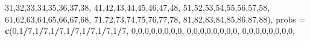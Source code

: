 \documentclass[,man,floatsintext]{apa6}
\newenvironment{Shaded}{\begin{snugshade}}{\end{snugshade}}
\newcommand{\DataTypeTok}[1]{\textcolor[rgb]{0.13,0.29,0.53}{#1}}
\newcommand{\DecValTok}[1]{\textcolor[rgb]{0.00,0.00,0.81}{#1}}
\newcommand{\KeywordTok}[1]{\textcolor[rgb]{0.13,0.29,0.53}{\textbf{#1}}}
\newcommand{\NormalTok}[1]{#1}
\newcommand{\OperatorTok}[1]{\textcolor[rgb]{0.81,0.36,0.00}{\textbf{#1}}}
\begin{document}
\begin{Shaded}
\begin{Highlighting}[]
                         \DecValTok{31}\NormalTok{,}\DecValTok{32}\NormalTok{,}\DecValTok{33}\NormalTok{,}\DecValTok{34}\NormalTok{,}\DecValTok{35}\NormalTok{,}\DecValTok{36}\NormalTok{,}\DecValTok{37}\NormalTok{,}\DecValTok{38}\NormalTok{,}
                         \DecValTok{41}\NormalTok{,}\DecValTok{42}\NormalTok{,}\DecValTok{43}\NormalTok{,}\DecValTok{44}\NormalTok{,}\DecValTok{45}\NormalTok{,}\DecValTok{46}\NormalTok{,}\DecValTok{47}\NormalTok{,}\DecValTok{48}\NormalTok{,}
                         \DecValTok{51}\NormalTok{,}\DecValTok{52}\NormalTok{,}\DecValTok{53}\NormalTok{,}\DecValTok{54}\NormalTok{,}\DecValTok{55}\NormalTok{,}\DecValTok{56}\NormalTok{,}\DecValTok{57}\NormalTok{,}\DecValTok{58}\NormalTok{,}
                         \DecValTok{61}\NormalTok{,}\DecValTok{62}\NormalTok{,}\DecValTok{63}\NormalTok{,}\DecValTok{64}\NormalTok{,}\DecValTok{65}\NormalTok{,}\DecValTok{66}\NormalTok{,}\DecValTok{67}\NormalTok{,}\DecValTok{68}\NormalTok{,}
                         \DecValTok{71}\NormalTok{,}\DecValTok{72}\NormalTok{,}\DecValTok{73}\NormalTok{,}\DecValTok{74}\NormalTok{,}\DecValTok{75}\NormalTok{,}\DecValTok{76}\NormalTok{,}\DecValTok{77}\NormalTok{,}\DecValTok{78}\NormalTok{,}
                         \DecValTok{81}\NormalTok{,}\DecValTok{82}\NormalTok{,}\DecValTok{83}\NormalTok{,}\DecValTok{84}\NormalTok{,}\DecValTok{85}\NormalTok{,}\DecValTok{86}\NormalTok{,}\DecValTok{87}\NormalTok{,}\DecValTok{88}\NormalTok{),}
               \DataTypeTok{probs =} \KeywordTok{c}\NormalTok{(}\DecValTok{0}\NormalTok{,}\DecValTok{1}\OperatorTok{/}\DecValTok{7}\NormalTok{,}\DecValTok{1}\OperatorTok{/}\DecValTok{7}\NormalTok{,}\DecValTok{1}\OperatorTok{/}\DecValTok{7}\NormalTok{,}\DecValTok{1}\OperatorTok{/}\DecValTok{7}\NormalTok{,}\DecValTok{1}\OperatorTok{/}\DecValTok{7}\NormalTok{,}\DecValTok{1}\OperatorTok{/}\DecValTok{7}\NormalTok{,}\DecValTok{1}\OperatorTok{/}\DecValTok{7}\NormalTok{,}
                         \DecValTok{0}\NormalTok{,}\DecValTok{0}\NormalTok{,}\DecValTok{0}\NormalTok{,}\DecValTok{0}\NormalTok{,}\DecValTok{0}\NormalTok{,}\DecValTok{0}\NormalTok{,}\DecValTok{0}\NormalTok{,}\DecValTok{0}\NormalTok{,}
                         \DecValTok{0}\NormalTok{,}\DecValTok{0}\NormalTok{,}\DecValTok{0}\NormalTok{,}\DecValTok{0}\NormalTok{,}\DecValTok{0}\NormalTok{,}\DecValTok{0}\NormalTok{,}\DecValTok{0}\NormalTok{,}\DecValTok{0}\NormalTok{,}
                         \DecValTok{0}\NormalTok{,}\DecValTok{0}\NormalTok{,}\DecValTok{0}\NormalTok{,}\DecValTok{0}\NormalTok{,}\DecValTok{0}\NormalTok{,}\DecValTok{0}\NormalTok{,}\DecValTok{0}\NormalTok{,}\DecValTok{0}\NormalTok{,}

\end{Highlighting}
\end{Shaded}
\end{document}
